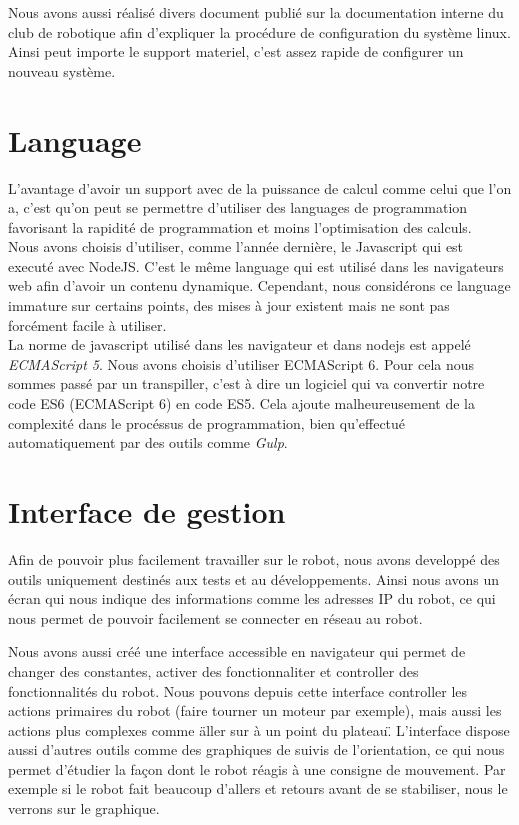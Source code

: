 	Nous avons aussi réalisé divers document publié sur la documentation interne du club de robotique afin d'expliquer la procédure de configuration du système linux. Ainsi peut importe le support materiel, c'est assez rapide de configurer un nouveau système.

	\section{Language}
	L'avantage d'avoir un support avec de la puissance de calcul comme celui que l'on a, c'est qu'on peut se permettre d'utiliser des languages de programmation favorisant la rapidité de programmation et moins l'optimisation des calculs.\\

	Nous avons choisis d'utiliser, comme l'année dernière, le Javascript qui est executé avec NodeJS. C'est le même language qui est utilisé dans les navigateurs web afin d'avoir un contenu dynamique. Cependant, nous considérons ce language immature sur certains points, des mises à jour existent mais ne sont pas forcément facile à utiliser.\\

	La norme de javascript utilisé dans les navigateur et dans nodejs est appelé \textit{ECMAScript 5}. Nous avons choisis d'utiliser ECMAScript 6. Pour cela nous sommes passé par un transpiller, c'est à dire un logiciel qui va convertir notre code ES6 (ECMAScript 6) en code ES5. Cela ajoute malheureusement de la complexité dans le procéssus de programmation, bien qu'effectué automatiquement par des outils comme \textit{Gulp}.

	\section{Interface de gestion}
	Afin de pouvoir plus facilement travailler sur le robot, nous avons developpé des outils uniquement destinés aux tests et au développements. Ainsi nous avons un écran qui nous indique des informations comme les adresses IP du robot, ce qui nous permet de pouvoir facilement se connecter en réseau au robot.

	Nous avons aussi créé une interface accessible en navigateur qui permet de changer des constantes, activer des fonctionnaliter et controller des fonctionnalités du robot. Nous pouvons depuis cette interface controller les actions primaires du robot (faire tourner un moteur par exemple), mais aussi les actions plus complexes comme \"aller sur à un point du plateau\". L'interface dispose aussi d'autres outils comme des graphiques de suivis de l'orientation, ce qui nous permet d'étudier la façon dont le robot réagis à une consigne de mouvement. Par exemple si le robot fait beaucoup d'allers et retours avant de se stabiliser, nous le verrons sur le graphique.

